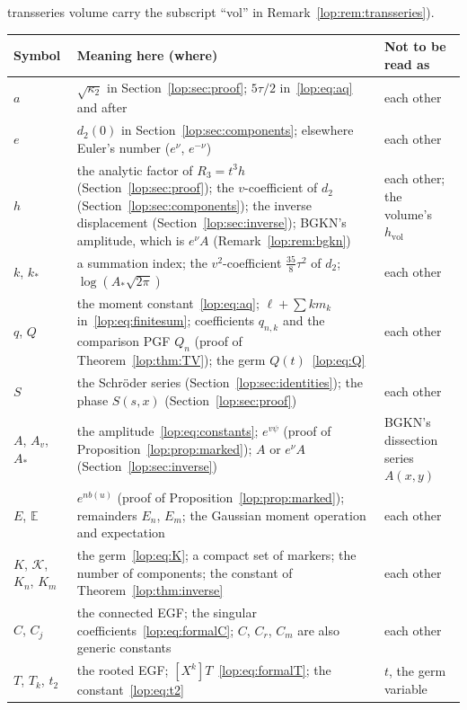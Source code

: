 \documentclass[11pt,letterpaper]{article}
\numberwithin{equation}{section}
\theoremstyle{remark}\newtheorem{remark}[theorem]{Remark}
\newcommand{\EE}{\mathbb E}
\begin{document}
transseries volume carry the subscript ``vol'' in
Remark~\ref{lop:rem:transseries}).\par\smallskip
\renewcommand{\arraystretch}{1.1}
\begin{longtable}{@{}>{\raggedright\arraybackslash}p{0.95in}>{\raggedright\arraybackslash}p{3.3in}>{\raggedright\arraybackslash}p{1.85in}@{}}
\toprule
Symbol & Meaning here (where) & Not to be read as\\
\midrule
\endhead
$a$ & $\sqrt{\kappa_2}$ in Section~\ref{lop:sec:proof}; $5\tau/2$ in~\eqref{lop:eq:aq} and after & each other\\
$e$ & $d_2(0)$ in Section~\ref{lop:sec:components}; elsewhere Euler's number ($e^\nu$, $e^{-\nu}$) & each other\\
$h$ & the analytic factor of $R_3=t^3h$ (Section~\ref{lop:sec:proof}); the $v$-coefficient of $d_2$ (Section~\ref{lop:sec:components}); the inverse displacement (Section~\ref{lop:sec:inverse}); BGKN's amplitude, which is $e^\nu A$ (Remark~\ref{lop:rem:bgkn}) & each other; the volume's $h_{\mathrm{vol}}$\\
$k$, $k_*$ & a summation index; the $v^2$-coefficient $\tfrac{35}8\tau^2$ of $d_2$; $\log(A_*\sqrt{2\pi})$ & each other\\
$q$, $Q$ & the moment constant~\eqref{lop:eq:aq}; $\ell+\sum km_k$ in~\eqref{lop:eq:finitesum}; coefficients $q_{n,k}$ and the comparison PGF $Q_n$ (proof of Theorem~\ref{lop:thm:TV}); the germ $Q(t)$~\eqref{lop:eq:Q} & each other\\
$S$ & the Schr\"oder series (Section~\ref{lop:sec:identities}); the phase $S(s,x)$ (Section~\ref{lop:sec:proof}) & each other\\
$A$, $A_v$, $A_*$ & the amplitude~\eqref{lop:eq:constants}; $e^{v\psi}$ (proof of Proposition~\ref{lop:prop:marked}); $A$ or $e^\nu A$ (Section~\ref{lop:sec:inverse}) & BGKN's dissection series $A(x,y)$\\
$E$, $\EE$ & $e^{nb(u)}$ (proof of Proposition~\ref{lop:prop:marked}); remainders $E_n$, $E_m$; the Gaussian moment operation and expectation & each other\\
$K$, $\mathcal K$, $K_n$, $K_m$ & the germ~\eqref{lop:eq:K}; a compact set of markers; the number of components; the constant of Theorem~\ref{lop:thm:inverse} & each other\\
$C$, $C_j$ & the connected EGF; the singular coefficients~\eqref{lop:eq:formalC}; $C$, $C_r$, $C_m$ are also generic constants & each other\\
$T$, $T_k$, $t_2$ & the rooted EGF; $[X^k]T$~\eqref{lop:eq:formalT}; the constant~\eqref{lop:eq:t2} & $t$, the germ variable\\

\end{longtable}
\end{document}
